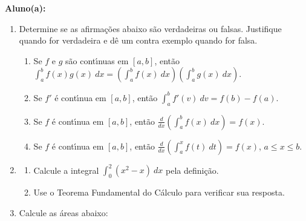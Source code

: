 \documentclass[a4paper,5pt]{amsbook}
\newcommand{\ds}{\displaystyle}
\begin{document}
\vspace{0.5cm}
{\bf Aluno(a):}\dotfill{}  %

\vspace{0.2cm}
\begin{enumerate}
	\vspace{0.5cm}

	\item Determine se as afirma\c{c}\~oes abaixo s\~ao verdadeiras ou falsas.
		Justifique quando for verdadeira e d\^e um contra exemplo quando for
		falsa.
		\begin{enumerate}
			\item Se $f$ e $g$ s\~ao cont\'{\i}nuas em $[a,b]$, ent\~ao $\ds\int_a^b
				f(x)g(x)\ dx = \left(\int_a^b f(x)\ dx\right)\left(\int_a^b
					g(x)\ dx\right)$.
			\item Se $f'$ \'e cont\'{\i}nua em $[a,b]$, ent\~ao $\ds\int_a^b f'(v)\ dv =
				f(b) - f(a)$.
			\item Se $f$ \'e cont\'{\i}nua em $[a,b]$, ent\~ao
				$\ds\frac{d}{dx}\left(\int_a^b f(x)\ dx\right) = f(x)$.
			\item Se $f$ \'e cont\'{\i}nua em $[a,b]$, ent\~ao
				$\ds\frac{d}{dx}\left(\int_a^x f(t)\ dt\right) = f(x)$, $a \le
				x \le b$.
		\end{enumerate}
	\vspace{0.5cm}

	\item
		\begin{enumerate}
			\item Calcule a integral $\ds\int_0^2 (x^2 - x)\ dx$ pela
				defini\c{c}\~ao.
			\item Use o Teorema Fundamental do C\'alculo para verificar sua
				resposta.
		\end{enumerate}
	\vspace{0.5cm}

	\item Calcule as \'areas abaixo:


\end{enumerate}
\end{document}
